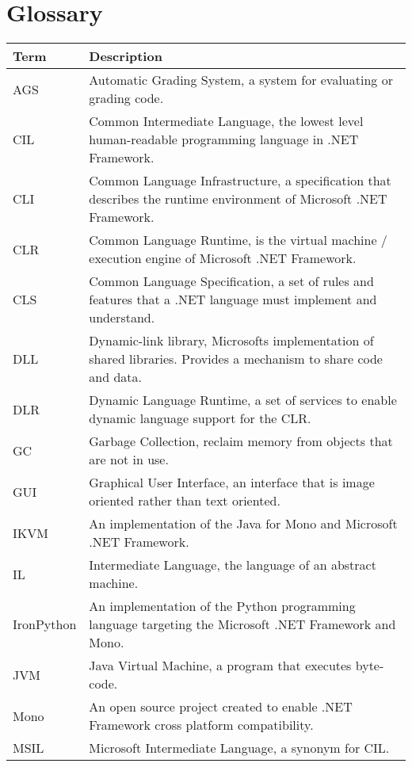 \chapter*{Glossary}

\begin{center}
	\begin{tabular} { m{3cm} | m{11cm} }
		\hline
		\textbf{Term}	& \textbf{Description} \\ \hline
		AGS				& Automatic Grading System, a system for evaluating or grading code. \\ \hline
		CIL				& Common Intermediate Language, the lowest level human-readable programming language in .NET Framework. \\ \hline
		CLI				& Common Language Infrastructure, a specification that describes the runtime environment of Microsoft .NET Framework. \\ \hline
		CLR				& Common Language Runtime, is the virtual machine / execution engine of Microsoft .NET Framework. \\ \hline
		CLS				& Common Language Specification, a set of rules and features that a .NET language must implement and understand. \\ \hline
		DLL				& Dynamic-link library, Microsofts implementation of shared libraries. Provides a mechanism to share code and data. \\ \hline
		DLR				& Dynamic Language Runtime, a set of services to enable dynamic language support for the CLR. \\ \hline
		GC 				& Garbage Collection, reclaim memory from objects that are not in use. \\ \hline
		GUI				& Graphical User Interface, an interface that is image oriented rather than text oriented. \\ \hline
		IKVM				& An implementation of the Java for Mono and Microsoft .NET Framework. \\ \hline
		IL				& Intermediate Language, the language of an abstract machine. \\ \hline
		IronPython			& An implementation of the Python programming language targeting the Microsoft .NET Framework and Mono. \\ \hline
		JVM				& Java Virtual Machine, a program that executes byte-code. \\ \hline
		Mono				& An open source project created to enable .NET Framework cross platform compatibility. \\ \hline
		MSIL				& Microsoft Intermediate Language, a synonym for CIL. \\ \hline
	\end{tabular}
\end{center}

